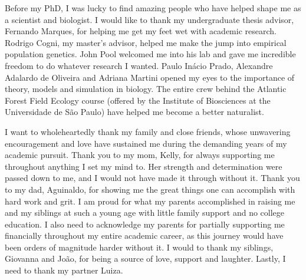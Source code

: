 {Before my PhD, I was lucky to find amazing people who have helped shape me as a scientist and biologist.
I would like to thank my undergraduate thesis advisor, Fernando Marques, for helping me get my feet wet with academic research.
Rodrigo Cogni, my master's advisor, helped me make the jump into empirical population genetics.
John Pool welcomed me into his lab and gave me incredible freedom to do whatever research I wanted.
Paulo Inácio Prado, Alexandre Adalardo de Oliveira and Adriana Martini opened my eyes to the importance of theory, models and simulation in biology.
The entire crew behind the Atlantic Forest Field Ecology course (offered by the Institute of Biosciences at the Universidade de São Paulo) have helped me become a better naturalist.

I want to wholeheartedly thank my family and close friends,
whose unwavering encouragement and love have sustained me during the demanding years of my academic pursuit.
Thank you to my mom, Kelly, for always supporting me throughout anything I set my mind to.
Her strength and determination were passed down to me, and I would not have made it through without it.
Thank you to my dad, Aguinaldo, for showing me the great things one can accomplish with hard work and grit.
I am proud for what my parents accomplished in raising me and my siblings
at such a young age with little family support and no college education.
I also need to acknowledge my parents for partially supporting me financially throughout my entire academic career,
as this journey would have been orders of magnitude harder without it.
I would to thank my siblings, Giovanna and João, for being a source of love, support and laughter.
Lastly, I need to thank my partner Luiza.



}

